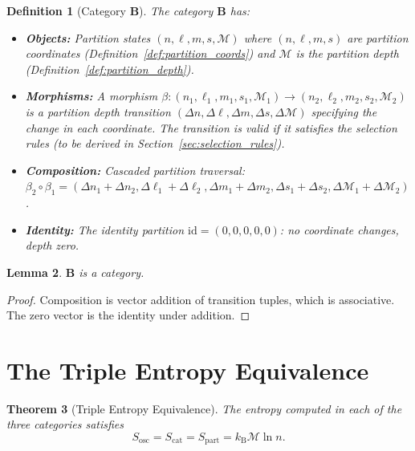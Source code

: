 \documentclass[twocolumn,10pt]{article}
\newtheorem{theorem}{Theorem}[section]
\newtheorem{lemma}[theorem]{Lemma}
\newtheorem{definition}[theorem]{Definition}
\theoremstyle{remark}
\newcommand{\kB}{k_{\mathrm{B}}}
\newcommand{\Depth}{\mathcal{M}}
\newcommand{\CatB}{\mathbf{B}}
\begin{document}
\begin{definition}[Category $\CatB$]
\label{def:catB}
The category $\CatB$ has:
\begin{itemize}
    \item \textbf{Objects:} Partition states $(n, \ell, m, s, \Depth)$ where $(n,\ell,m,s)$ are partition coordinates (Definition~\ref{def:partition_coords}) and $\Depth$ is the partition depth (Definition~\ref{def:partition_depth}).

    \item \textbf{Morphisms:} A morphism $\beta: (n_1,\ell_1,m_1,s_1,\Depth_1) \to (n_2,\ell_2,m_2,s_2,\Depth_2)$ is a partition depth transition $(\Delta n, \Delta \ell, \Delta m, \Delta s, \Delta\Depth)$ specifying the change in each coordinate.
    The transition is \emph{valid} if it satisfies the selection rules (to be derived in Section~\ref{sec:selection_rules}).

    \item \textbf{Composition:} Cascaded partition traversal: $\beta_2 \circ \beta_1 = (\Delta n_1 + \Delta n_2, \Delta\ell_1 + \Delta\ell_2, \Delta m_1 + \Delta m_2, \Delta s_1 + \Delta s_2, \Delta\Depth_1 + \Delta\Depth_2)$.

    \item \textbf{Identity:} The identity partition $\mathrm{id} = (0,0,0,0,0)$: no coordinate changes, depth zero.
\end{itemize}
\end{definition}

\begin{lemma}
$\CatB$ is a category.
\end{lemma}
\begin{proof}
Composition is vector addition of transition tuples, which is associative.
The zero vector is the identity under addition.
\end{proof}

\section{The Triple Entropy Equivalence}
\label{sec:triple_equivalence}

\begin{theorem}[Triple Entropy Equivalence]
\label{thm:triple_entropy}
The entropy computed in each of the three categories satisfies
\begin{equation}
S_{\mathrm{osc}} = S_{\mathrm{cat}} = S_{\mathrm{part}} = \kB \Depth \ln n.
\label{eq:triple_entropy}
\end{equation}
\end{theorem}
\end{document}
